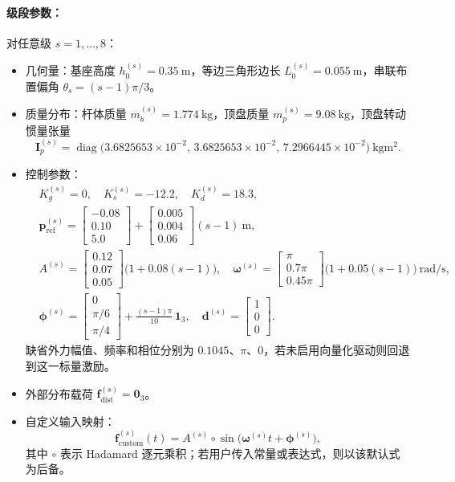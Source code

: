 \documentclass[12pt,a4paper]{article}
\begin{document}
\paragraph{级段参数：}
对任意级 $s = 1,\ldots,8$：
\begin{itemize}
  \item 几何量：基座高度 $h_0^{(s)} = 0.35~\si{\meter}$，等边三角形边长 $L_0^{(s)} = 0.055~\si{\meter}$，串联布置偏角 $\theta_s = (s-1)\pi/3$。
  \item 质量分布：杆体质量 $m_b^{(s)} = 1.774~\si{\kilogram}$，顶盘质量 $m_p^{(s)} = 9.08~\si{\kilogram}$，顶盘转动惯量张量
  \begin{equation}
    \bm I_p^{(s)} = \operatorname{diag}\big(3.6825653\times10^{-2},\, 3.6825653\times10^{-2},\, 7.2966445\times10^{-2}\big)~\si{\kilogram\meter\squared}.
  \end{equation}
  \item 控制参数：
  \begin{align}
    &K_g^{(s)} = 0,\quad K_s^{(s)} = -12.2,\quad K_d^{(s)} = 18.3,\\
    &\bm p_{\text{ref}}^{(s)} = \begin{bmatrix}-0.08\\ 0.10\\ 5.0\end{bmatrix} + \begin{bmatrix}0.005\\ 0.004\\ 0.06\end{bmatrix}(s-1)~\si{\meter},\\
    &A^{(s)} = \begin{bmatrix}0.12\\ 0.07\\ 0.05\end{bmatrix}\!\big(1 + 0.08 (s-1)\big),\quad
      \bm\omega^{(s)} = \begin{bmatrix}\pi\\ 0.7\pi\\ 0.45\pi\end{bmatrix}\!\big(1 + 0.05 (s-1)\big)~\si{\radian\per\second},\\
    &\bm \phi^{(s)} = \begin{bmatrix}0\\ \pi/6\\ \pi/4\end{bmatrix} + \frac{(s-1)\pi}{10}\,\bm 1_3,\quad
      \bm d^{(s)} = \begin{bmatrix}1\\ 0\\ 0\end{bmatrix}.
  \end{align}
    缺省外力幅值、频率和相位分别为 $0.1045$、$\pi$、$0$，若未启用向量化驱动则回退到这一标量激励。
  \item 外部分布载荷 $\bm f_{\text{dist}}^{(s)} = \bm 0_3$。
  \item 自定义输入映射：
  \begin{equation}
    \bm f_{\text{custom}}^{(s)}(t) = A^{(s)} \circ \sin\big(\bm\omega^{(s)} t + \bm \phi^{(s)}\big),
  \end{equation}
    其中 $\circ$ 表示 Hadamard 逐元乘积；若用户传入常量或表达式，则以该默认式为后备。
\end{itemize}
\end{document}
